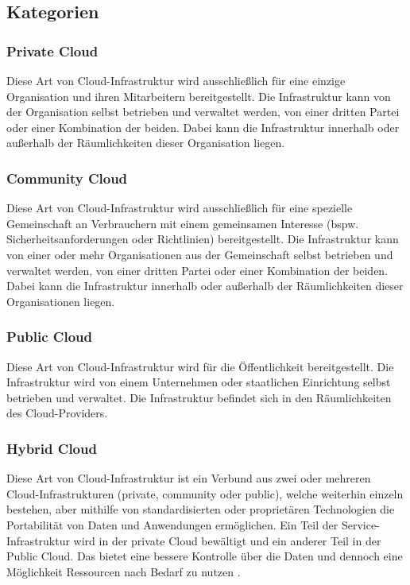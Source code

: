 \subsection{Kategorien}
\subsubsection{Private Cloud}
Diese Art von Cloud-Infrastruktur wird ausschließlich für eine einzige Organisation und ihren Mitarbeitern bereitgestellt. Die Infrastruktur kann von der Organisation selbst betrieben und verwaltet werden, von einer dritten Partei oder einer Kombination der beiden. Dabei kann die Infrastruktur innerhalb oder außerhalb der Räumlichkeiten dieser Organisation liegen\cite{nist_definition}.

\subsubsection{Community Cloud}
Diese Art von Cloud-Infrastruktur wird ausschließlich für eine spezielle Gemeinschaft an Verbrauchern mit einem gemeinsamen Interesse (bspw. Sicherheitsanforderungen oder Richtlinien) bereitgestellt. Die Infrastruktur kann von einer oder mehr Organisationen aus der Gemeinschaft selbst betrieben und verwaltet werden, von einer dritten Partei oder einer Kombination der beiden. Dabei kann die Infrastruktur innerhalb oder außerhalb der Räumlichkeiten dieser Organisationen liegen\cite{nist_definition}.

\subsubsection{Public Cloud}
Diese Art von Cloud-Infrastruktur wird für die Öffentlichkeit bereitgestellt. Die Infrastruktur wird von einem Unternehmen oder staatlichen Einrichtung selbst betrieben und verwaltet. Die Infrastruktur befindet sich in den Räumlichkeiten des Cloud-Providers\cite{nist_definition}.

\subsubsection{Hybrid Cloud}
Diese Art von Cloud-Infrastruktur ist ein Verbund aus zwei oder mehreren Cloud-Infrastrukturen (private, community oder public), welche weiterhin einzeln bestehen, aber mithilfe von standardisierten oder proprietären Technologien die Portabilität von Daten und Anwendungen ermöglichen\cite{nist_definition}. Ein Teil der Service-Infrastruktur wird in der private Cloud bewältigt und ein anderer Teil in der Public Cloud. Das bietet eine bessere Kontrolle über die Daten und dennoch eine Möglichkeit Ressourcen nach Bedarf zu nutzen \cite{study_cc_cdb}.

